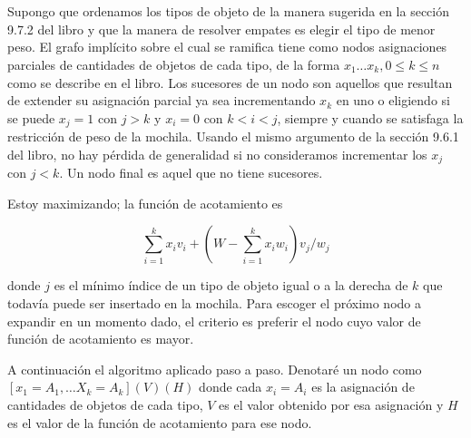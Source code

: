 \documentclass{article}
\begin{document}
\section{}

Supongo que ordenamos los tipos de objeto de la manera sugerida en la sección 9.7.2 del libro y que la manera
de resolver empates es elegir el tipo de menor peso.
El grafo implícito sobre el cual se ramifica tiene como nodos asignaciones parciales de cantidades
de objetos de cada tipo, de la forma $x_1 \ldots x_k, 0 \leq k \leq n$ como se describe en el libro. Los sucesores
de un nodo son aquellos que resultan de extender su asignación parcial ya sea incrementando $x_k$ en uno o
eligiendo si se puede $x_j = 1$ con $j > k$ y $x_i = 0$ con $k < i < j$, siempre y cuando se satisfaga la 
restricción de peso de la mochila.
Usando el mismo argumento de la sección 9.6.1 del libro, no hay pérdida de generalidad
si no consideramos incrementar los $x_j$ con $j < k$. Un nodo final es aquel que no tiene sucesores.

Estoy maximizando; la función de acotamiento es

$$
\sum_{i=1}^k x_i v_i + \left( W - \sum_{i=1}^k x_i w_i \right) v_{j}/w_{j}
$$

donde $j$ es el mínimo índice de un tipo de objeto igual o a la derecha de $k$ que todavía
puede ser insertado en la mochila. Para escoger el próximo nodo a expandir en un momento dado, el criterio es
preferir el nodo cuyo valor de función de acotamiento es mayor.

A continuación el algoritmo aplicado paso a paso. Denotaré un nodo como $[x_1=A_1, \ldots X_k=A_k] (V)(H)$ donde
cada $x_i = A_i$ es la asignación de cantidades de objetos de cada tipo, $V$ es el valor obtenido por esa asignación y $H$ es el valor
de la función de acotamiento para ese nodo.

\renewcommand{\labelenumi}{\arabic{enumi}.}
\end{document}

